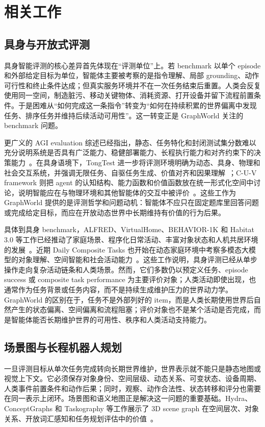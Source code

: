 \documentclass[journal]{IEEEtran}
\begin{document}
\section{相关工作}
\subsection{具身与开放式评测}
具身智能评测的核心差异首先体现在“评测单位”上。若 benchmark 以单个 episode 和外部给定目标为单位，智能体主要被考察的是指令理解、局部 grounding、动作可行性和终止条件达成；但真实服务环境并不在一次任务结束后重置。人类会反复使用同一空间，制造脏污、移动关键物体、消耗资源、打开设备并留下流程前置条件。于是困难从“如何完成这一条指令”转变为“如何在持续积累的世界偏离中发现任务、排序任务并维持后续活动可用性”。这一转变正是 GraphWorld 关注的 benchmark 问题。

更广义的 AGI evaluation 综述已经指出，静态、任务特化和封闭测试集分数难以充分说明系统是否具有广泛能力、稳健部署能力、长程执行能力和对齐约束下的决策能力~\cite{agisurvey2024,agieval2025}。在具身语境下，TongTest 进一步将评测环境明确为动态、具身、物理和社会交互系统，并强调无限任务、自驱任务生成、价值对齐和因果理解~\cite{tongtest2024}；C-U-V framework 则把 agent 的认知结构、能力函数和价值函数放在统一形式化空间中讨论，说明智能应在与物理环境和其他智能体的交互中被评价~\cite{cuv2026}。这些工作为 GraphWorld 提供的是评测哲学和问题动机：智能体不应只在固定题库里回答问题或完成给定目标，而应在开放动态世界中长期维持有价值的行为后果。

具体到具身 benchmark，ALFRED、VirtualHome、BEHAVIOR-1K 和 Habitat 3.0 等工作已经推动了家庭场景、程序化日常活动、丰富对象状态和人机共居环境的发展~\cite{alfred2020,virtualhome2018,behavior1k2024,habitat3_2023}。近期 Daily Composite Tasks 也开始在动态家庭环境中考察多模态大模型的对象理解、空间智能和社会活动能力~\cite{dailycomposite2025}。这些工作说明，具身评测已经从单步操作走向复杂活动链条和人类场景。然而，它们多数仍以预定义任务、episode success 或 composite task performance 为主要评价对象；人类活动即使出现，也通常作为任务背景或任务内容，而不是持续生成维护压力的世界动力学。GraphWorld 的区别在于，任务不是外部列好的 item，而是人类长期使用世界后自然产生的状态偏离、空间偏离和流程阻塞；评价对象也不是某个活动是否完成，而是智能体能否长期维护世界的可用性、秩序和人类活动支持能力。

\subsection{场景图与长程机器人规划}
一旦评测目标从单次任务完成转向长期世界维护，世界表示就不能只是静态地图或视觉上下文。它必须保存对象身份、空间层级、动态关系、可变状态、设备周期、人类事件前置条件和动作后果；同时，观察、动作合法性、状态转移和评分也需要在同一表示上闭环。场景图和语义地图正是解决这一问题的重要基础。Hydra、ConceptGraphs 和 Taskography 等工作展示了 3D scene graph 在空间层次、对象关系、开放词汇感知和任务规划评估中的价值~\cite{hydrarss2022,conceptgraphs2024,taskography2022}。
\end{document}
